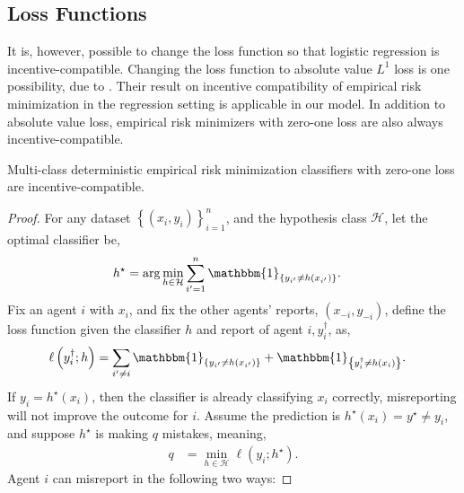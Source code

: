 \documentclass{article}
\begin{document}
\subsection{Loss Functions}
It is, however, possible to change the loss function so that logistic regression is incentive-compatible. Changing the loss function to absolute value $L^{1}$ loss is one possibility, due to \citet*{dekel2010incentive}. Their result on incentive compatibility of empirical risk minimization in the regression setting is applicable in our model. In addition to absolute value loss, empirical risk minimizers with zero-one loss are also always incentive-compatible.
\newline \newline
\begin{prop} \label{prop:zolog} 
Multi-class deterministic empirical risk minimization classifiers with zero-one loss are incentive-compatible.
\end{prop}
\begin{proof} \label{proof:zologpf} 
For any dataset $\left\{\left(x_{i}, y_{i}\right)\right\}_{i=1}^{n}$, and the hypothesis class $\mathcal{H}$, let the optimal classifier be,
\begin{align*}
h^\star  &= \arg\displaystyle\min_{h \in \mathcal{H}} \displaystyle\sum_{i'=1}^{n} \mathbbm{1}_{\left\{y_{i'} \neq  h\left(x_{i'}\right)\right\}}.
\end{align*}
Fix an agent $i $ with $x_{i}$, and fix the other agents' reports, $\left(x_{-i}, y_{-i}\right)$, define the loss function given the classifier $h $ and report of agent $i , y^{\dagger}_{i}$, as,
\begin{align*}
\ell\left(y^{\dagger}_{i}; h\right) &= \displaystyle\sum_{i' \neq  i} \mathbbm{1}_{\left\{y_{i'} \neq  h\left(x_{i'}\right)\right\}} + \mathbbm{1}_{\left\{y^{\dagger}_{i} \neq  h\left(x_{i}\right)\right\}}.
\end{align*}
If $y_{i} = h^\star \left(x_{i}\right)$, then the classifier is already classifying $x_{i}$ correctly, misreporting will not improve the outcome for $i $. Assume the prediction is $h^\star \left(x_{i}\right) = y^\star  \neq  y_{i}$, and suppose $h^\star $ is making $q $ mistakes, meaning,
\begin{align*}
q  &= \displaystyle\min_{h \in \mathcal{H}} \ell\left(y_{i} ; h^\star \right).
\end{align*}
Agent $i $ can misreport in the following two ways:
\end{proof}
\end{document}

